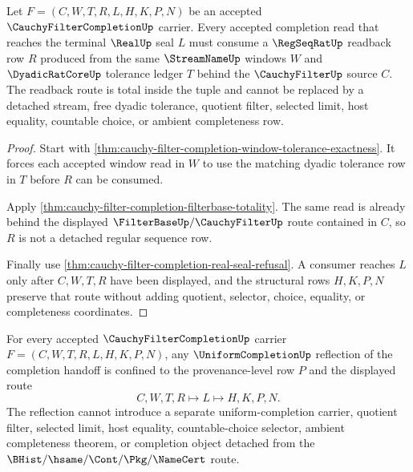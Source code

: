 \begin{theorem}
\label{thm:cauchy-filter-completion-regular-readback-totality}
Let $F=(C,W,T,R,L,H,K,P,N)$ be an accepted $\CauchyFilterCompletionUp$ carrier. Every accepted completion read that reaches the terminal $\RealUp$ seal $L$ must consume a $\RegSeqRatUp$ readback row $R$ produced from the same $\StreamNameUp$ windows $W$ and $\DyadicRatCoreUp$ tolerance ledger $T$ behind the $\CauchyFilterUp$ source $C$. The readback route is total inside the tuple and cannot be replaced by a detached stream, free dyadic tolerance, quotient filter, selected limit, host equality, countable choice, or ambient completeness row.
\end{theorem}
\begin{proof}
Start with \autoref{thm:cauchy-filter-completion-window-tolerance-exactness}. It forces each accepted window read in $W$ to use the matching dyadic tolerance row in $T$ before $R$ can be consumed.

Apply \autoref{thm:cauchy-filter-completion-filterbase-totality}. The same read is already behind the displayed $\FilterBaseUp/\CauchyFilterUp$ route contained in $C$, so $R$ is not a detached regular sequence row.

Finally use \autoref{thm:cauchy-filter-completion-real-seal-refusal}. A consumer reaches $L$ only after $C,W,T,R$ have been displayed, and the structural rows $H,K,P,N$ preserve that route without adding quotient, selector, choice, equality, or completeness coordinates.
\end{proof}
\begin{theorem}
\label{thm:cauchy-filter-completion-uniform-reflection-nonescape}
For every accepted $\CauchyFilterCompletionUp$ carrier $F=(C,W,T,R,L,H,K,P,N)$, any $\UniformCompletionUp$ reflection of the completion handoff is confined to the provenance-level row $P$ and the displayed route
$$
C,W,T,R \longmapsto L \longmapsto H,K,P,N .
$$
The reflection cannot introduce a separate uniform-completion carrier, quotient filter, selected limit, host equality, countable-choice selector, ambient completeness theorem, or completion object detached from the $\BHist/\hsame/\Cont/\Pkg/\NameCert$ route.
\end{theorem}
